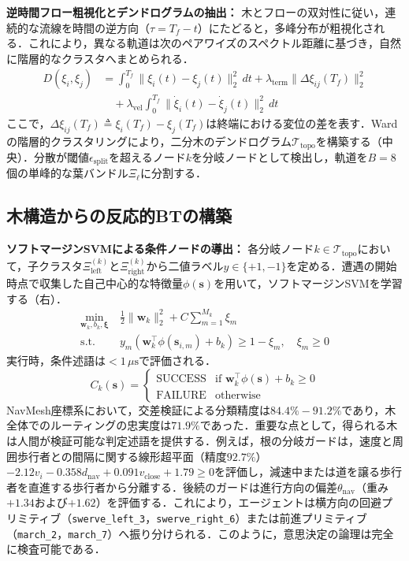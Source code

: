 \documentclass{sice-si}
\begin{document}
\textbf{逆時間フロー粗視化とデンドログラムの抽出：}
木とフローの双対性\cite{ramachandran2026trees}に従い，連続的な流線を時間の逆方向（$\tau = T_f - t$）にたどると，多峰分布が粗視化される．これにより，異なる軌道は次のペアワイズのスペクトル距離に基づき，自然に階層的なクラスタへまとめられる．
\begin{align}
    D(\xi_i, \xi_j) &= \int_0^{T_f} \|\xi_i(t) - \xi_j(t)\|_2^2 \, dt + \lambda_{\text{term}} \|\Delta \xi_{ij}(T_f)\|_2^2 \nonumber \\
    &\quad + \lambda_{\text{vel}} \int_0^{T_f} \|\dot{\xi}_i(t) - \dot{\xi}_j(t)\|_2^2 \, dt
\end{align}
ここで，$\Delta \xi_{ij}(T_f) \triangleq \xi_i(T_f) - \xi_j(T_f)$は終端における変位の差を表す．Wardの階層的クラスタリングにより，二分木のデンドログラム$\mathcal{T}_{\text{topo}}$を構築する（中央）．分散が閾値$\epsilon_{\text{split}}$を超えるノード$k$を分岐ノードとして検出し，軌道を$B=8$個の単峰的な葉バンドル$\Xi_\ell$に分割する．

\subsection{木構造からの反応的BTの構築}
\textbf{ソフトマージンSVMによる条件ノードの導出：}
各分岐ノード$k \in \mathcal{T}_{\text{topo}}$において，子クラスタ$\Xi_{\text{left}}^{(k)}$と$\Xi_{\text{right}}^{(k)}$から二値ラベル$y \in \{+1, -1\}$を定める．遭遇の開始時点で収集した自己中心的な特徴量$\phi(\mathbf{s})$を用いて，ソフトマージンSVMを学習する（右）．
\begin{align}
    \min_{\mathbf{w}_k, b_k, \boldsymbol{\xi}} \ & \frac{1}{2} \|\mathbf{w}_k\|_2^2 + C \sum_{m=1}^{M_k} \xi_m \\
    \text{s.t.} \ & y_m (\mathbf{w}_k^\top \phi(\mathbf{s}_{i, m}) + b_k) \ge 1 - \xi_m, \quad \xi_m \ge 0 \nonumber
\end{align}
実行時，条件述語は$< 1\,\mu\text{s}$で評価される．
\begin{equation}
    C_k(\mathbf{s}) = \begin{cases} \text{SUCCESS} & \text{if } \mathbf{w}_k^\top \phi(\mathbf{s}) + b_k \ge 0 \\ \text{FAILURE} & \text{otherwise} \end{cases}
\end{equation}
NavMesh座標系において，交差検証による分類精度は$84.4\% - 91.2\%$であり，木全体でのルーティングの忠実度は$71.9\%$であった．重要な点として，得られる木は人間が検証可能な判定述語を提供する．例えば，根の分岐ガードは，速度と周囲歩行者との間隔に関する線形超平面（精度$92.7\%$）$-2.12 v_i - 0.358 d_{\text{nav}} + 0.091 v_{\text{close}} + 1.79 \ge 0$を評価し，減速中または道を譲る歩行者を直進する歩行者から分離する．後続のガードは進行方向の偏差$\theta_{\text{nav}}$（重み$+1.34$および$+1.62$）を評価する．これにより，エージェントは横方向の回避プリミティブ（\texttt{swerve\_left\_3}，\texttt{swerve\_right\_6}）または前進プリミティブ（\texttt{march\_2}，\texttt{march\_7}）へ振り分けられる．このように，意思決定の論理は完全に検査可能である．
\end{document}
